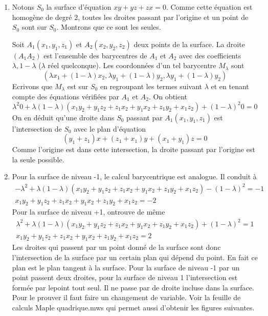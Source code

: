 \begin{enumerate}
\item Notons $S_{0}$ la surface d'équation $xy+yz+zx=0$. Comme cette équation est homogène de degré 2, toutes les droites passant par l'origine et un point de $S_{0}$ sont sur $S_{0}$. Montrons que ce sont les seules.

Soit $A_{1}(x_{1},y_{1},z_{1})$ et $A_{2}(x_{2},y_{2},z_{2})$ deux points de la surface. La droite $(A_{1}A_{2})$ est l'ensemble des barycentres de $A_{1}$ et $A_{2}$ avec des coefficients $\lambda,1-\lambda$ ($\lambda$ réel quelconque). Les coordonnées d'un tel barycentre $M_{\lambda}$ sont
\[(\lambda x_{1}+(1-\lambda)x_{2},\lambda y_{1}+(1-\lambda)y_{2},\lambda y_{1}+(1-\lambda)y_{2})\]
Ecrivons que $ M_{\lambda}$ est sur $S_{0}$ en regroupant les termes suivant $\lambda$ et en tenant compte des équations vérifiées par $A_{1}$ et $A_{2}$. On obtient
\[\lambda^{2}0+\lambda(1-\lambda)(x_{1}y_{2}+y_{1}z_{2}+z_{1}x_{2}+ y_{1}x_{2}+z_{1}y_{2}+x_{1}z_{2})+(1-\lambda)^{2}0=0\]
On en déduit qu'une droite dans $S_{0}$ passant par $A_{1}(x_{1},y_{1},z_{1})$ est l'intersection de $S_{0}$ avec le plan d'équation
\[(y_{1}+z_{1})x+(z_{1}+x_{1})y+(x_{1}+y_{1})z=0\]
Comme l'origine est dans cette intersection, la droite passant par l'origine est la seule possible.
\item Pour la surface de niveau -1, le calcul barycentrique est analogue. Il conduit à
\begin{eqnarray*}
-\lambda^{2}+\lambda(1-\lambda)(x_{1}y_{2}+y_{1}z_{2}+z_{1}x_{2}+ y_{1}x_{2}+z_{1}y_{2}+x_{1}z_{2})-(1-\lambda)^{2}=-1\\
x_{1}y_{2}+y_{1}z_{2}+z_{1}x_{2}+ y_{1}x_{2}+z_{1}y_{2}+x_{1}z_{2}=-2
\end{eqnarray*}
Pour la surface de niveau +1, ontrouve de même
\begin{eqnarray*}
\lambda^{2}+\lambda(1-\lambda)(x_{1}y_{2}+y_{1}z_{2}+z_{1}x_{2}+ y_{1}x_{2}+z_{1}y_{2}+x_{1}z_{2})+(1-\lambda)^{2}=1\\
x_{1}y_{2}+y_{1}z_{2}+z_{1}x_{2}+ y_{1}x_{2}+z_{1}y_{2}+x_{1}z_{2}=2
\end{eqnarray*}
Les droites qui passent par un point donné de la surface sont donc l'intersection de la surface par un certain plan qui dépend du point. En fait ce plan est le plan tangent à la surface. Pour la surface de niveau -1 par un point passent deux droites, pour la surface de niveau 1 l'intersection est formée par lepoint tout seul. Il ne passe par de droite incluse dans la surface. Pour le prouver il faut faire un changement de variable. Voir la feuille de calculs Maple quadrique.mws qui permet aussi d'obtenir les figures suivantes.
\end{enumerate}

